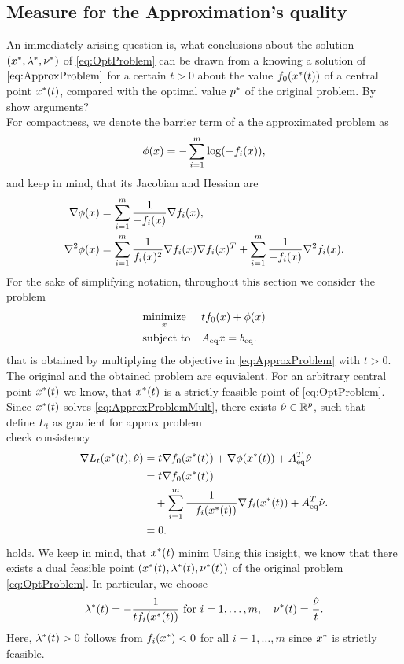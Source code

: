 \subsection{Measure for the Approximation's quality}
An immediately arising question is, what conclusions about the solution $ (x^*,\lambda^*, \nu^*) $ of \eqref{eq:OptProblem} can be drawn from a knowing a solution of $ \eqref{eq:ApproxProblem} $ for a certain $ t>0 $ about the value $ f_0(x^*(t)) $  of a central point $ x^*(t) $, compared with the optimal value $ p^* $ of the original problem. 
By \todo show arguments?\\
For compactness, we denote the barrier term of a the approximated problem as
\[ \phi(x) = - \sum_{i=1}^{m} \log(-f_i(x)),\] and keep in mind, that its Jacobian and Hessian are
\begin{align*}
	\nabla \phi(x)&= \sum_{i=1}^{m} \frac{1}{-f_i(x)} \nabla f_i(x),\\
	\nabla^2 \phi(x) &= \sum_{i=1}^{m} \frac{1}{f_i(x)^2} \nabla f_i(x) \nabla f_i(x)^T + \sum_{i=1}^{m}\frac{1}{-f_i(x)} \nabla^2 f_i (x).
\end{align*}
For the sake of simplifying notation, throughout this section we consider the problem
\begin{equation}
	\begin{aligned} & \underset{x}{\text{minimize}} & & tf_0(x) + \phi(x) \\ & \text{subject to} & &{A}_{\mathrm{eq}} x = {b}_{\mathrm{eq}}. \end{aligned} \label{eq:ApproxProblemMult}
\end{equation}
that is obtained by multiplying the objective in \eqref{eq:ApproxProblem} with $ t>0 $. The original and the obtained problem are equvialent.
For an arbitrary central point $ x^*(t) $ we know, that $ x^*(t) $ is a strictly feasible point of \eqref{eq:OptProblem}. Since $ x^*(t) $ solves \eqref{eq:ApproxProblemMult}, there exists $ \hat{\nu} \in \mathbb{R}^p$, such that\\
\todo define $ L_t $ as gradient for approx problem\\
\todo check consistency
\begin{align}
	\nabla L_t(x^*(t), \hat{\nu}) &= t \nabla f_0(x^*(t)) + \nabla \phi(x^*(t)) + {A}_{\mathrm{eq}} ^T \hat{\nu}\\
					&= t\nabla f_0 (x^*(t)) \notag\\&\quad+ \sum_{i=1}^{m} \frac{1}{-f_i(x^*(t))} \nabla f_i(x^*(t)) + {A}_{\mathrm{eq}}^T \hat{\nu}.\\&=0.
					\label{eq:centralPathLagr}
\end{align}
holds. We keep in mind, that $ x^*(t) $ minim
Using this insight, we know that there exists a dual feasible point $ (x^*(t),\lambda^*(t), \nu^*(t)) $ of the original problem \eqref{eq:OptProblem}. In particular, we choose
\begin{gather*}
	\lambda^*(t) = -\frac{1}{tf_i(x^*(t))}\text{ for }i=1,\dots,m,\quad \nu^*(t)= \frac{\hat{\nu}}{t}.
\end{gather*}
Here, $ \lambda^*(t) > 0 $ follows from $ f_i(x^*) < 0 $ for all $ i = 1,\dots,m $ since $ x^*  $ is strictly feasible.


